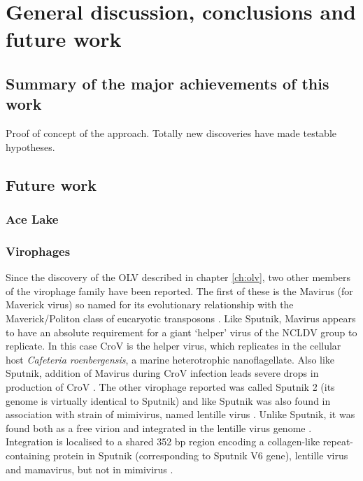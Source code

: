 \chapter{General discussion, conclusions and future work}
\label{ch:conc}
\acresetall

\section{Summary of the major achievements of this work}

Proof of concept of the approach.
Totally new discoveries have made testable hypotheses.

\section{Future work}
\subsection{Ace Lake}

\subsection{Virophages}
Since the discovery of the \ac{OLV} \cite{Yau2011} described in chapter \ref{ch:olv}, two other members of the virophage family have been reported.
The first of these is the Mavirus (for Maverick virus) so named for its evolutionary relationship with the Maverick/Politon class of eucaryotic transposons \cite{Fischer2011}.
Like Sputnik, Mavirus appears to have an absolute requirement for a giant `helper' virus of the \ac{NCLDV} group to replicate.
In this case \ac{CroV} is the helper virus, which replicates in the cellular host \emph{Cafeteria roenbergensis}, a marine heterotrophic nanoflagellate. 
Also like Sputnik, addition of Mavirus during \ac{CroV} infection leads severe drops in production of \ac{CroV} \cite{Fischer2011}.
The other virophage reported was called Sputnik 2 (its genome is virtually identical to Sputnik) and like Sputnik was also found in association with strain of mimivirus, named lentille virus \cite{Desnues2012}.
Unlike Sputnik, it was found both as a free virion and integrated in the lentille virus genome \cite{Desnues2012}.
Integration is localised to a shared 352 bp region encoding a collagen-like repeat-containing protein in Sputnik (corresponding to Sputnik V6 gene), lentille virus and mamavirus, but not in mimivirus  \cite{Desnues2010}.

